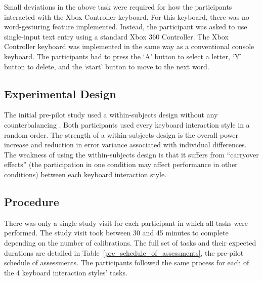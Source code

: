 Small deviations in the above task were required for how the participants interacted with the Xbox Controller keyboard. For this keyboard, there was no word-gesturing feature implemented. Instead, the participant was asked to use single-input text entry using a standard Xbox 360 Controller. The Xbox Controller keyboard was implemented in the same way as a conventional console keyboard. The participants had to press the `A' button to select a letter, `Y' button to delete, and the `start' button to move to the next word.

\subsection{Experimental Design} \label{pre_experimental_design}
The initial pre-pilot study used a within-subjects design without any counterbalancing \cite{ref_within_subjects}. Both participants used every keyboard interaction style in a random order. The strength of a within-subjects design is the overall power increase and reduction in error variance associated with individual differences. The weakness of using the within-subjects design is that it suffers from ``carryover effects'' (the participation in one condition may affect performance in other conditions) between each keyboard interaction style.

\subsection{Procedure} \label{pre_procedure}
There was only a single study visit for each participant in which all tasks were performed. The study visit took between 30 and 45 minutes to complete depending on the number of calibrations. The full set of tasks and their expected durations are detailed in Table~\ref{pre_schedule_of_assessments}, the pre-pilot schedule of assessments. The participants followed the same process for each of the 4 keyboard interaction styles' tasks.

\begin{table}[!b]
	\centering
	\caption[Pre-pilot Study Schedule of Assessments]{\centering Schedule of Assessments for a single study visit during the pre-pilot study (in minutes).}
	\label{pre_schedule_of_assessments}
\end{table}

